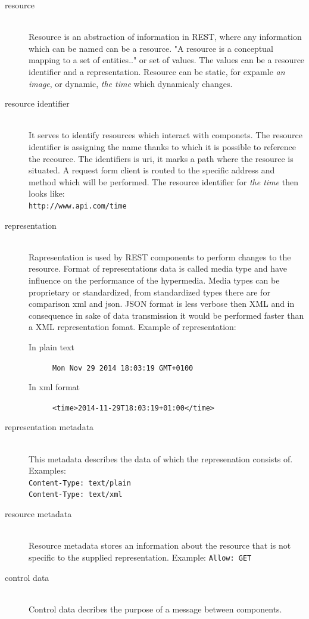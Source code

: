 \begin{description}
  \item [resource] \hfill \\ 
  Resource is an abstraction of information in REST, where any information which can be named can be a resource. "A resource is a conceptual mapping to a set of entities.." \cite{fielding} or set of values. The values can be a resource identifier and a representation.
  Resource can be static, for expamle \emph{an image}, or dynamic, \emph{the time} which dynamicaly changes.
  \item [resource identifier] \hfill \\
  It serves to identify resources which interact with componets. The resource identifier is assigning the name thanks to which it is possible to reference the recource. The identifiers is \gls{uri}, it marks a path where the resource is situated. A request form client is routed to the specific address and method which will be performed.
  The resource identifier for \emph{the time} then looks like: \hfill \\
  \texttt{http://www.api.com/time}
  \item [representation] \hfill \\
  Rapresentation is used by REST components to perform changes to the resource. Format of representations data is called media type and have influence on the performance of the hypermedia. Media types can be proprietary or standardized, from standardized types there are for comparison \gls{xml} and \gls{json}. JSON format is less verbose then XML and in consequence in sake of data transmission it would be performed faster than a XML representation fomat.
  Example of representation:
  \begin{description}
    \item[In plain text] \texttt{Mon Nov 29 2014 18:03:19 GMT+0100}
    \item[In xml format] \texttt{<time>2014-11-29T18:03:19+01:00</time>}
  \end{description}
  
  
  \item [representation metadata] \hfill \\
  This metadata describes the data of which the represenation consists of.
  Examples: \hfill \\
  \texttt{Content-Type: text/plain} \hfill \\
  \texttt{Content-Type: text/xml}
   \item [resource metadata] \hfill \\
  Resource metadata stores an information about the resource that is not specific to the supplied representation.
  Example: \texttt{Allow: GET}
  \item [control data] \hfill \\
  Control data decribes the purpose of a message between components. %
\end{description}

